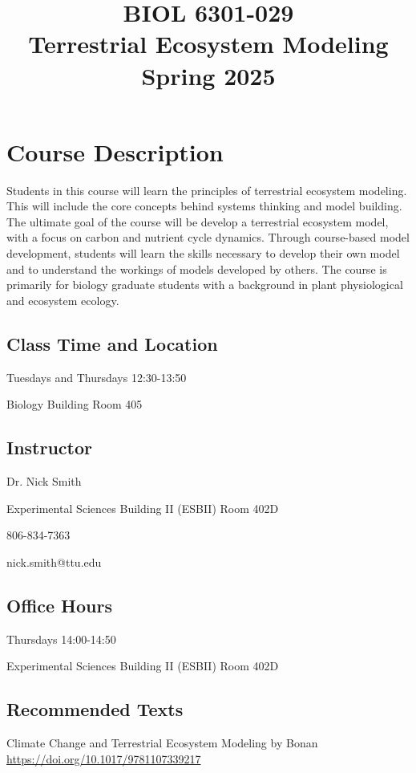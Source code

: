 \documentclass[12pt, notitlepage]{article}   	%
\title{
	\textbf{
		BIOL 6301-029
	} \\
	\large Terrestrial Ecosystem Modeling \\
	\large Spring 2025
}
\date{\vspace{-5ex}}
\begin{document}
{\selectfont %

\maketitle

\section{Course Description}
Students in this course will learn the principles of terrestrial ecosystem modeling.
This will include the core concepts behind systems thinking and model building.
The ultimate goal of the course will be develop a terrestrial ecosystem model, with
a focus on carbon and nutrient cycle dynamics. Through course-based model development,
students will learn the skills necessary to develop their own model and to understand
the workings of models developed by others. The course is primarily for biology
graduate students with a background in plant physiological and ecosystem ecology.

\subsection{Class Time and Location}
Tuesdays and Thursdays 12:30-13:50

Biology Building Room 405

\subsection{Instructor}
Dr. Nick Smith \par
Experimental Sciences Building II (ESBII) Room 402D \par
806-834-7363 \par
nick.smith@ttu.edu \par

\subsection{Office Hours}
Thursdays 14:00-14:50 \par
Experimental Sciences Building II (ESBII) Room 402D \par

\subsection{Recommended Texts}
Climate Change and Terrestrial Ecosystem Modeling
by Bonan
\url{https://doi.org/10.1017/9781107339217}\par

}
\end{document}
